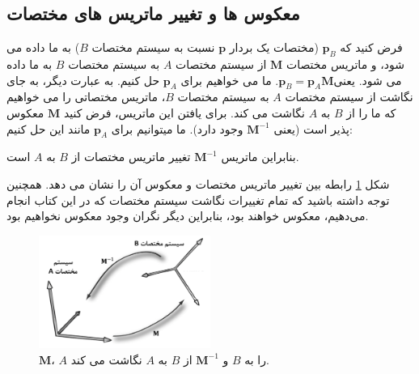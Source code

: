 \subsection{\textbf{معکوس ها و تغییر ماتریس های مختصات}}
\label{subsec:3.4.5}
{
    \Large
    \begin{spacing}{1.5}
        فرض کنید که $\textbf{p}_{B}$ (مختصات یک بردار $\textbf{p}$ نسبت به سیستم مختصات $B$) به ما داده می شود، و ماتریس مختصات $\textbf{M}$ از سیستم مختصات $A$ به سیستم مختصات $B$ به ما داده می شود.
        یعنی$\textbf{p}_{B}=\textbf{p}_{A}\textbf{M}$. ما می خواهیم برای $\textbf{p}_{A}$ حل کنیم.
        به عبارت دیگر، به جای نگاشت از سیستم مختصات $A$ به سیستم مختصات $B$، ماتریس مختصاتی را می خواهیم که ما را از $B$ به $A$ نگاشت می کند.
        برای یافتن این ماتریس، فرض کنید $\textbf{M}$ معکوس پذیر است (یعنی $\textbf{M}^{-1}$ وجود دارد). ما میتوانیم برای $\textbf{p}_{A}$ مانند این حل کنیم:

        \begin{flushleft}
        \end{flushleft}

        بنابراین ماتریس $\textbf{M}^{-1}$ تغییر ماتریس مختصات از $B$ به $A$ است.

        شکل \ref{fig:4.Session.1.3.13} رابطه بین تغییر ماتریس مختصات و معکوس آن را نشان می دهد.
        همچنین توجه داشته باشید که تمام تغییرات نگاشت سیستم مختصات که در این کتاب انجام می‌دهیم، معکوس خواهند بود، بنابراین دیگر نگران وجود معکوس نخواهیم بود.

        \begin{figure}[H]
            \centering
            \setlength{\belowcaptionskip}{-10pt}
            \includegraphics[width=0.5\textwidth]{Images/4/3/4.Session.1.3.13}
            \caption {$\textbf{M}$، $A$ را به $B$ و $\textbf{M}^{-1}$ از $B$ به $A$ نگاشت می کند.}
            \label{fig:4.Session.1.3.13}
        \end{figure}


\end{spacing}}
